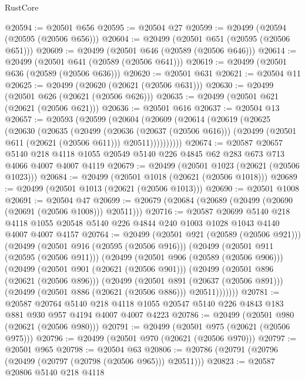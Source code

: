 \begin{lexlean}{RustCore}
\begin{coremodule}
@20594 := @20501 @656
@20595 := @20504 @27
@20599 := @20499 (@20594 (@20595 (@20506 @656)))
@20604 := @20499 (@20501 @651 (@20595 (@20506 @651)))
@20609 := @20499 (@20501 @646 (@20589 (@20506 @646)))
@20614 := @20499 (@20501 @641 (@20589 (@20506 @641)))
@20619 := @20499 (@20501 @636 (@20589 (@20506 @636)))
@20620 := @20501 @631
@20621 := @20504 @11
@20625 := @20499 (@20620 (@20621 (@20506 @631)))
@20630 := @20499 (@20501 @626 (@20621 (@20506 @626)))
@20635 := @20499 (@20501 @621 (@20621 (@20506 @621)))
@20636 := @20501 @616
@20637 := @20504 @13
@20657 := @20593
    (@20599
      (@20604
        (@20609
          (@20614
            (@20619
              (@20625
                (@20630
                  (@20635
                    (@20499
                      (@20636 (@20637 (@20506 @616)))
                      (@20499 (@20501 @611 (@20621 (@20506 @611))) @20511))))))))))
@20674 := @20587
    @20657
    @5140
    @218
    @4118
    @1055
    @20549
    @5140
    @226
    @4845
    @62
    @283
    @673
    @713
    @4066
    @4007
    @4007
    @4119
@20679 := @20499 (@20501 @1023 (@20621 (@20506 @1023)))
@20684 := @20499 (@20501 @1018 (@20621 (@20506 @1018)))
@20689 := @20499 (@20501 @1013 (@20621 (@20506 @1013)))
@20690 := @20501 @1008
@20691 := @20504 @47
@20699 := @20679 (@20684 (@20689 (@20499 (@20690 (@20691 (@20506 @1008))) @20511)))
@20716 := @20587
    @20699
    @5140
    @218
    @4118
    @1055
    @20548
    @5140
    @226
    @4844
    @240
    @1003
    @1028
    @1043
    @4140
    @4007
    @4007
    @4157
@20764 := @20499
    (@20501 @921 (@20589 (@20506 @921)))
    (@20499
      (@20501 @916 (@20595 (@20506 @916)))
      (@20499
        (@20501 @911 (@20595 (@20506 @911)))
        (@20499
          (@20501 @906 (@20589 (@20506 @906)))
          (@20499
            (@20501 @901 (@20621 (@20506 @901)))
            (@20499
              (@20501 @896 (@20621 (@20506 @896)))
              (@20499
                (@20501 @891 (@20637 (@20506 @891)))
                (@20499 (@20501 @886 (@20621 (@20506 @886))) @20511)))))))
@20781 := @20587
    @20764
    @5140
    @218
    @4118
    @1055
    @20547
    @5140
    @226
    @4843
    @183
    @881
    @930
    @957
    @4194
    @4007
    @4007
    @4223
@20786 := @20499 (@20501 @980 (@20621 (@20506 @980)))
@20791 := @20499 (@20501 @975 (@20621 (@20506 @975)))
@20796 := @20499 (@20501 @970 (@20621 (@20506 @970)))
@20797 := @20501 @965
@20798 := @20504 @63
@20806 := @20786 (@20791 (@20796 (@20499 (@20797 (@20798 (@20506 @965))) @20511)))
@20823 := @20587
    @20806
    @5140
    @218
    @4118

\end{coremodule}
\end{lexlean}
